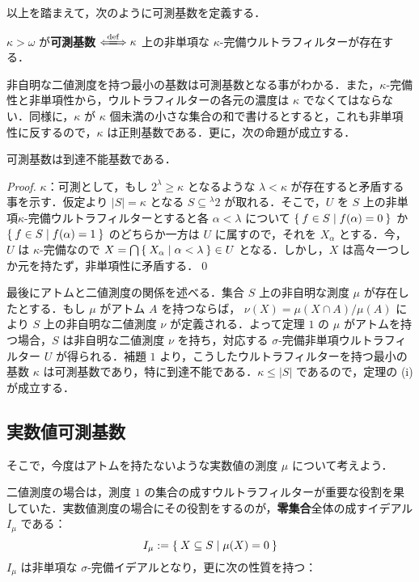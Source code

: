 \documentclass[a4j]{jsarticle}
\begin{document}
以上を踏まえて，次のように可測基数を定義する．

\begin{definition}
 $\kappa > \omega$ が{\bfseries 可測基数} $\defs \kappa$ 上の非単項な $\kappa$-完備ウルトラフィルターが存在する．
\end{definition}
非自明な二値測度を持つ最小の基数は可測基数となる事がわかる．また，$\kappa$-完備性と非単項性から，ウルトラフィルターの各元の濃度は $\kappa$ でなくてはならない．同様に，$\kappa$ が $\kappa$ 個未満の小さな集合の和で書けるとすると，これも非単項性に反するので，$\kappa$ は正則基数である．更に，次の命題が成立する．

\begin{lemma}\label{Lem:measurable-is-inaccessible}
 可測基数は到達不能基数である．
\end{lemma}
\begin{proof}
 $\kappa$：可測として，もし $2^\lambda \geq \kappa$ となるような $\lambda < \kappa$ が存在すると矛盾する事を示す．仮定より $|S| = \kappa$ となる $S \subseteq {}^\lambda 2$ が取れる．そこで，$U$ を $S$ 上の非単項$\kappa$-完備ウルトラフィルターとすると各 $\alpha < \lambda$ について $\Set{ f \in S | f(\alpha) = 0 }$ か $\Set{ f \in S | f(\alpha) = 1 }$ のどちらか一方は $U$ に属すので，それを $X_\alpha$ とする．今，$U$ は $\kappa$-完備なので $X = \bigcap \Set{X_\alpha | \alpha < \lambda} \in U$ となる．しかし，$X$ は高々一つしか元を持たず，非単項性に矛盾する．\qed{}
\end{proof}

最後にアトムと二値測度の関係を述べる．集合 $S$ 上の非自明な測度 $\mu$ が存在したとする．もし $\mu$ がアトム $A$ を持つならば， $\nu(X) = \mu(X \cap A)/\mu(A)$ により $S$ 上の非自明な二値測度 $\nu$ が定義される．よって定理 $1$ の $\mu$ がアトムを持つ場合，$S$ は非自明な二値測度 $\nu$ を持ち，対応する $\sigma$-完備非単項ウルトラフィルター $U$ が得られる．補題 $1$ より，こうしたウルトラフィルターを持つ最小の基数 $\kappa$ は可測基数であり，特に到達不能である．$\kappa \leq |S|$ であるので，定理の (i) が成立する．

\subsection{実数値可測基数}
そこで，今度はアトムを持たないような実数値の測度 $\mu$ について考えよう．

二値測度の場合は，測度 $1$ の集合の成すウルトラフィルターが重要な役割を果していた．実数値測度の場合にその役割をするのが，{\bfseries 零集合}全体の成すイデアル $I_\mu$ である：
\[
 I_\mu \mathrel{:=} \Set{X \subseteq S | \mu(X) = 0}
\]
$I_\mu$ は非単項な $\sigma$-完備イデアルとなり，更に次の性質を持つ：
\end{document}
